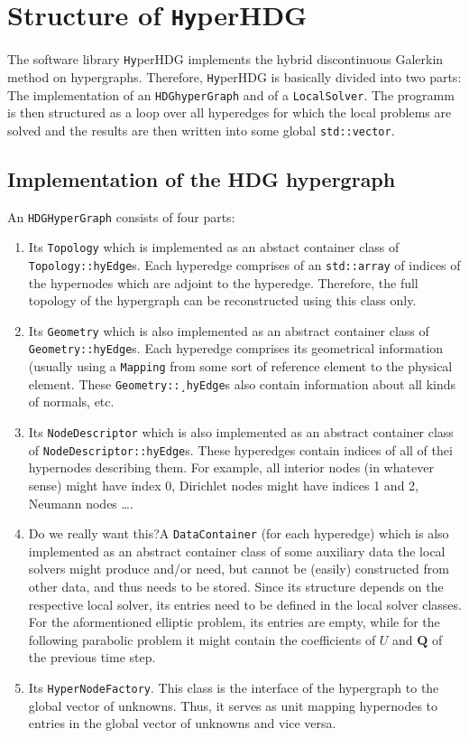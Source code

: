\documentclass[a4paper, english, 12pt, reqno, draft]{amsart}
\theoremstyle{definition}
\theoremstyle{remark}
\numberwithin{equation}{section}
\newcommand{\hyperHDG}{{\fontfamily{pzc}\selectfont \texttt{Hy}\hspace{-1.5pt}perHDG }}
\renewcommand{\vec}[1]{\ensuremath{\boldsymbol{#1}}}
\newcommand{\code}[1]{\texttt{#1}}
\begin{document}
\section{Structure of \hyperHDG}
% 
The software library \hyperHDG implements the hybrid discontinuous Galerkin method on hypergraphs. Therefore, \hyperHDG is basically divided into two parts: The implementation of an \code{HDGhyperGraph} and of a \code{LocalSolver}. The programm is then structured as a loop over all hyperedges for which the local problems are solved and the results are then written into some global \code{std::vector}.
% 
\subsection{Implementation of the HDG hypergraph}
% 
An \code{HDG\-Hyper\-Graph} consists of four parts:
% 
\begin{enumerate}
 \item Its \code{Topology} which is implemented as an abstact container class of \code{Topology::hyEdge}s. Each hyperedge comprises of an \code{std::array} of indices of the hypernodes which are adjoint to the hyperedge. Therefore, the full topology of the hypergraph can be reconstructed using this class only.
 \item Its \code{Geometry} which is also implemented as an abstract container class of \code{Geometry::hyEdge}s. Each hyperedge comprises its geometrical information (usually using a \code{Mapping} from some sort of reference element to the physical element. These \code{Geometry::\-¸hyEdge}s also contain information about all kinds of normals, etc.
 \item Its \code{NodeDescriptor} which is also implemented as an abstract container class of \code{NodeDescriptor::hyEdge}s. These hyperedges contain indices of all of thei hypernodes describing them. For example, all interior nodes (in whatever sense) might have index 0, Dirichlet nodes might have indices 1 and 2, Neumann nodes \ldots.
 \item \begin{envarwarning}{Do we really want this?}A \code{DataContainer} (for each hyperedge) which is also implemented as an abstract container class of some auxiliary data the local solvers might produce and/or need, but cannot be (easily) constructed from other data, and thus needs to be stored. Since its structure depends on the respective local solver, its entries need to be defined in the local solver classes. For the aformentioned elliptic problem, its entries are empty, while for the following parabolic problem it might contain the coefficients of $U$ and $\vec Q$ of the previous time step.\end{envarwarning}
 \item Its \code{HyperNodeFactory}. This class is the interface of the hypergraph to the global vector of unknowns. Thus, it serves as unit mapping hypernodes to entries in the global vector of unknowns and vice versa.
\end{enumerate}
\end{document}
